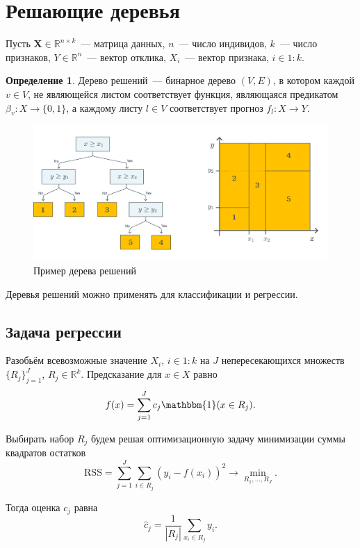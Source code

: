 \documentclass{article}
\theoremstyle{definition}
\newtheorem{definition}{Определение}
\theoremstyle{theorem}
\theoremstyle{remark}
\theoremstyle{theorem}
\theoremstyle{example}
\theoremstyle{theorem}
\theoremstyle{theorem}
\theoremstyle{theorem}
\theoremstyle{theorem}
\begin{document}
\tableofcontents

\newpage

\section{Решающие деревья}
	Пусть $\mathbf X\in\mathbb R^{n\times k}$~--- матрица данных, $n$~--- число индивидов, $k$~--- число признаков, $Y\in\mathbb R^n$~--- вектор отклика, $X_i$~--- вектор признака, $i\in1:k$.
	\begin{definition}
		Дерево решений~--- бинарное дерево $(V,E)$, в котором каждой $v\in V$, не являющейся листом соответствует функция, являющаяся предикатом $\beta_v:X\to\{0,1\}$, а каждому листу $l\in V$ соответствует прогноз $f_l:X\to Y$.
	\end{definition}
	\begin{figure}[h!]
			\includegraphics[width=\textwidth]{bintree_class.png}	\caption{Пример дерева решений}
	\end{figure}
	
	Деревья решений можно применять для классификации и регрессии.
	\subsection{Задача регрессии}
		Разобьём всевозможные значение $X_i$, $i\in1:k$ на $J$ непересекающихся множеств $\{R_j\}_{j=1}^J$, $R_j\in\mathbb R^k$. Предсказание для $x\in X$ равно $$f(x)=\sum\limits_{j=1}^Jc_j\mathbbm{1}(x\in R_j).$$
		
		Выбирать набор $R_j$ будем решая оптимизационную задачу минимизации суммы квадратов остатков $$\mathrm{RSS}=\sum\limits_{j=1}^J\sum\limits_{i\in R_j}(y_i-f(x_i))^2\to\min\limits_{R_1,\ldots,R_J}.$$ 
		
		Тогда оценка $c_j$ равна $$\widehat{c}_j=\frac1{|R_j|}\sum\limits_{x_i\in R_j}y_i.$$
		
\end{document}

